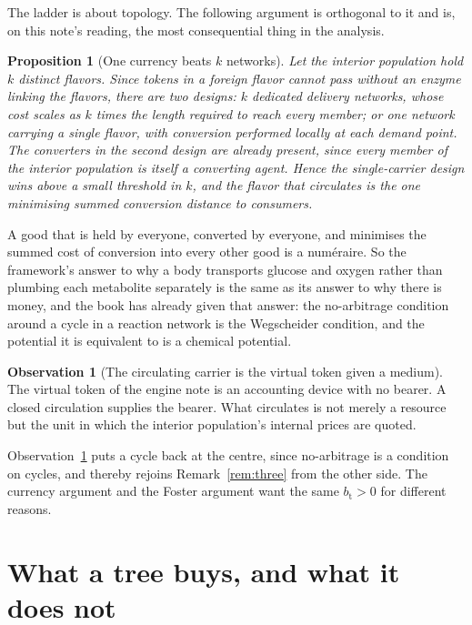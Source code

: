 \documentclass[11pt]{article}
\theoremstyle{plain}
\newtheorem{proposition}[theorem]{Proposition}
\theoremstyle{definition}
\newtheorem{observation}[theorem]{Observation}
\newcommand{\bt}{b_{\mathrm{t}}}
\begin{document}
The ladder is about topology. The following argument is orthogonal to it and is, on this note's
reading, the most consequential thing in the analysis.

\begin{proposition}[One currency beats $k$ networks]
\label{prop:P}
Let the interior population hold $k$ distinct flavors. Since tokens in a foreign flavor cannot pass
without an enzyme linking the flavors, there are two designs: $k$ dedicated delivery networks, whose
cost scales as $k$ times the length required to reach every member; or one network carrying a single
flavor, with conversion performed locally at each demand point. The converters in the second design
are already present, since every member of the interior population is itself a converting agent.
Hence the single-carrier design wins above a small threshold in $k$, and the flavor that circulates
is the one minimising summed conversion distance to consumers.
\end{proposition}

A good that is held by everyone, converted by everyone, and minimises the summed cost of conversion
into every other good is a num\'{e}raire. So the framework's answer to why a body transports glucose
and oxygen rather than plumbing each metabolite separately is the same as its answer to why there is
money, and the book has already given that answer: the no-arbitrage condition around a cycle in a
reaction network is the Wegscheider condition, and the potential it is equivalent to is a chemical
potential.

\begin{observation}[The circulating carrier is the virtual token given a medium]
\label{obs:numeraire}
The virtual token of the engine note is an accounting device with no bearer. A closed circulation
supplies the bearer. What circulates is not merely a resource but the unit in which the interior
population's internal prices are quoted.
\end{observation}

Observation~\ref{obs:numeraire} puts a cycle back at the centre, since no-arbitrage is a condition on
cycles, and thereby rejoins Remark~\ref{rem:three} from the other side. The currency argument and the
Foster argument want the same $\bt > 0$ for different reasons.

\section{What a tree buys, and what it does not}
\label{sec:tree}
\end{document}
